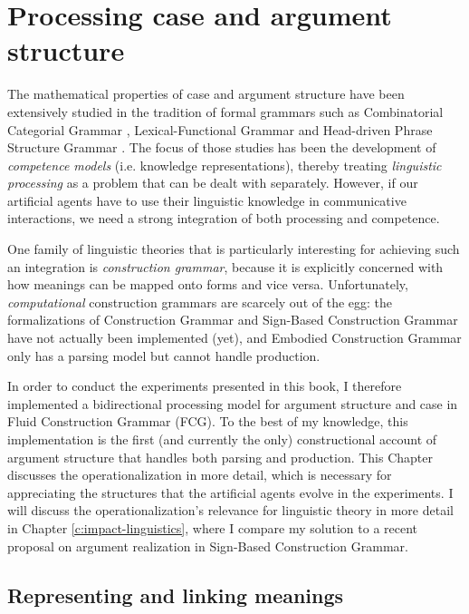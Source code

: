 
\setcounter{chapter}{1}
\chapter{Processing case and argument structure}
\label{c:ar}

The mathematical properties of case and argument structure have been extensively studied in the tradition of formal grammars such as Combinatorial Categorial Grammar \citep[CCG;][]{steedman00syntactic}, Lexical-Functional Grammar \citep[LFG;][]{bresnan82mental} and Head-driven Phrase Structure Grammar \citep[HPSG;][]{sag94hpsg}. The focus of those studies has been the development of {\em competence models} (i.e. knowledge representations), thereby treating {\em linguistic processing} as a problem that can be dealt with separately. However, if our artificial agents have to use their linguistic knowledge in communicative interactions, we need a strong integration of both processing and competence.

One family of linguistic theories that is particularly interesting for achieving such an integration is {\em construction grammar}, because it is explicitly concerned with how meanings can be mapped onto forms and vice versa. Unfortunately, {\em computational} construction grammars are scarcely out of the egg: the formalizations of Construction Grammar \citep[CxG;][]{kay99grammatical} and Sign-Based Construction Grammar \citep[SBCG;][]{boas13sbcg} have not actually been implemented (yet), and Embodied Construction Grammar \citep[ECG,][]{bergen05embodied} only has a parsing model but cannot handle production.

In order to conduct the experiments presented in this book, I therefore implemented a bidirectional processing model for argument structure and case in Fluid Construction Grammar (FCG). To the best of my knowledge, this implementation is the first (and currently the only) constructional account of argument structure that handles both parsing and production. This Chapter discusses the operationalization in more detail, which is necessary for appreciating the structures that the artificial agents evolve in the experiments. I will discuss the operationalization's relevance for linguistic theory in more detail in Chapter \ref{c:impact-linguistics}, where I compare my solution to a recent proposal on argument realization in Sign-Based Construction Grammar. 

\section{Representing and linking meanings}
\label{s:linking}


